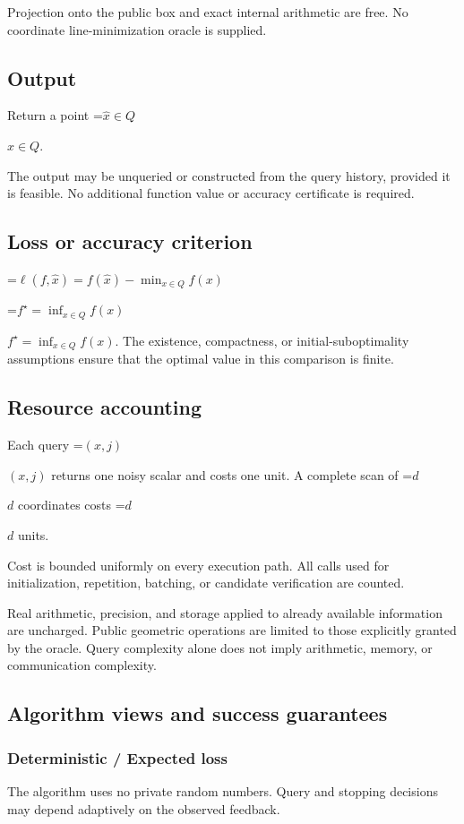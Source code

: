\documentclass[10pt,a4paper]{article}
\newcommand{\AtlasMath}[1]{\par\begingroup\centering\setbox0=\hbox{$\displaystyle #1$}\ifdim\wd0>1.4\linewidth\typeout{ATLAS WIDE FORMULA: \the\wd0}\fi\ifdim\wd0>\linewidth\resizebox{\linewidth}{!}{\box0}\else\box0\fi\par\endgroup}
\newcommand{\AtlasInlineMath}[1]{\begingroup\setbox0=\hbox{$#1$}\ifdim\wd0>.4\linewidth\endgroup\AtlasMath{#1}\else\endgroup$#1$\fi}
\begin{document}
Projection onto the public box and exact internal arithmetic are free. No coordinate line-minimization oracle is supplied.

\subsection{Output}
Return a point \AtlasInlineMath{\widehat x\in Q}.

The output may be unqueried or constructed from the query history, provided it is feasible. No additional function value or accuracy certificate is required.

\subsection{Loss or accuracy criterion}

\AtlasMath{\ell(f,\widehat{x})=f(\widehat{x})-\min_{x\in Q}f(x)}


\AtlasInlineMath{f^\star=\inf_{x\in Q}f(x)}. The existence, compactness, or initial-suboptimality assumptions ensure that the optimal value in this comparison is finite.

\subsection{Resource accounting}
Each query \AtlasInlineMath{(x,j)} returns one noisy scalar and costs one unit. A complete scan of \AtlasInlineMath{d} coordinates costs \AtlasInlineMath{d} units.

Cost is bounded uniformly on every execution path. All calls used for initialization, repetition, batching, or candidate verification are counted.

Real arithmetic, precision, and storage applied to already available information are uncharged. Public geometric operations are limited to those explicitly granted by the oracle. Query complexity alone does not imply arithmetic, memory, or communication complexity.

\subsection{Algorithm views and success guarantees}
\subsubsection{Deterministic / Expected loss}
The algorithm uses no private random numbers. Query and stopping decisions may depend adaptively on the observed feedback.
\end{document}
